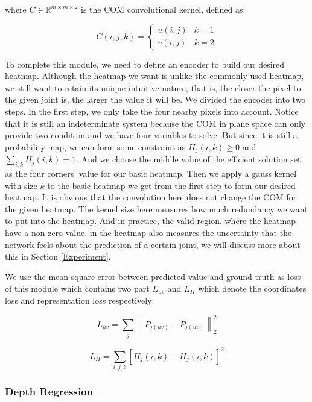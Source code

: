 \documentclass[journal]{IEEEtran}
\begin{document}
where $C \in \mathbb{R}^{m \times m \times 2}$ is the COM convolutional kernel, defined as: 

\begin{equation}
  C(i, j, k)=\left\{\begin{array}{ll}{u(i, j)} & {k=1} \\ {v(i, j)} & {k=2}\end{array}\right.
\end{equation}

To complete this module, we need to define an encoder to build our desired heatmap. 
Although the heatmap we want is unlike the commonly used heatmap, we still want to retain its unique intuitive nature, 
that is, the closer the pixel to the given joint is, the larger the value it will be. We divided the encoder into two steps. 
In the first step, we only take the four nearby pixels into account. 
Notice that it is still an indeterminate system because the COM in plane space can only provide two condition and we have four variables to solve. 
But since it is still a probability map, we can form some constraint as $H_{j}(i, k) \geq 0$ and $\sum_{i, k} H_{j}(i, k)=1$. 
And we choose the middle value of the efficient solution set as the four corners’ value for our basic heatmap. 
Then we apply a gauss kernel with size $k$ to the basic heatmap we get from the first step to form our desired heatmap. 
It is obvious that the convolution here does not change the COM for the given heatmap. 
The kernel size here measures how much redundancy we want to put into the heatmap. 
And in practice, the valid region, where the heatmap have a non-zero value, 
in the heatmap also measures the uncertainty that the network feels about the prediction of a certain joint, 
we will discuss more about this in Section \ref{Experiment}.

We use the mean-square-error between predicted value and ground truth as loss of this module 
which contains two part $L_{u v}$ and $L_{H}$ which denote the coordinates loss and representation loss respectively:

\begin{equation}
  L_{u v}=\sum_{j}\left\|P_{j(u v)}-\tilde{P}_{j(u v)}\right\|_{2}^{2}
\end{equation}

\begin{equation}
  L_{H}=\sum_{i, j, k}\left[H_{j}(i, k)-\tilde{H}_{j}(i, k)\right]^{2}
\end{equation}

\subsubsection{Depth Regression}
\end{document}
